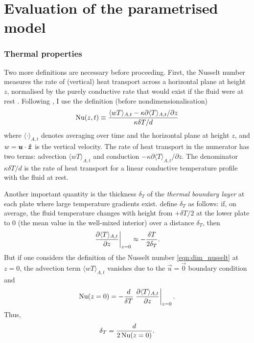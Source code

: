\documentclass[../main.tex]{subfiles}
\begin{document}
\ifSubfilesClassLoaded{
    \frontmatter
    \tableofcontents
    \mainmatter
}{}

\chapter{Evaluation of the parametrised model} \label{chap:evaluation}

\subsection{Thermal properties}
Two more definitions are necessary before proceeding. First, the Nusselt number
measures the rate of (vertical) heat transport across a horizontal plane at
height $z$, normalised by the purely conductive rate that would exist if the
fluid were at rest \parencite{verzicco1999}. Following \textcite{chilla2012}, I
use the definition (before nondimensionalisation)
\begin{equation}
    \label{eqn:dim_nusselt}
    \mathrm{Nu}(z,t) \equiv \frac{
        \langle wT \rangle_{A,t}
        - \kappa \partial \langle T \rangle_{A,t} / \partial z
    }{
        \kappa \delta T / d
    }
\end{equation}
where $\langle \cdot \rangle_{A,t}$ denotes averaging over time and the
horizontal plane at height $z$, and $w = \bm{u} \cdot \bm{\hat{z}}$ is the
vertical velocity. The rate of heat transport in the numerator has two terms:
advection $\langle wT \rangle_{A,t}$ and conduction $-\kappa \partial \langle T
\rangle_{A,t} / \partial z$. The denominator $\kappa \delta T / d$ is the rate
of heat transport for a linear conductive temperature profile with the fluid at
rest.

Another important quantity is the thickness $\delta_T$ of the \emph{thermal
boundary layer} at each plate where large temperature gradients exist.
\textcite{chilla2012} define $\delta_T$ as follows: if, on average, the fluid
temperature changes with height from $+\delta T/2$ at the lower plate to $0$
(the mean value in the well-mixed interior) over a distance $\delta_T$, then
\[
    \left. \frac{\partial \langle T \rangle_{A,t}}{\partial z} \right|_{z=0}
        \approx -\frac{\delta T}{2 \delta_T}.
\]
But if one considers the definition of the Nusselt number
\cref{eqn:dim_nusselt} at $z=0$, the advection term $\langle wT \rangle_{A,t}$
vanishes due to the $\vec{u} = \vec{0}$ boundary condition and
\[
    \mathrm{Nu}(z=0) = -\frac{d}{\delta T}
        \left. \frac{\partial \langle T \rangle_{A,t}}{\partial z} \right|_{z=0}.
\]
Thus,
\begin{equation}
    \label{eqn:thermal_bl}
    \delta_T = \frac{d}{2\,\mathrm{Nu}(z=0)}.
\end{equation}
\end{document}
